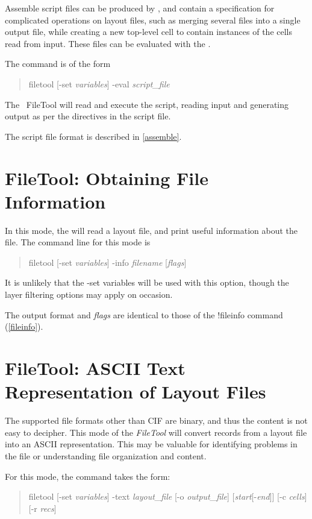 Assemble script files can be produced by {\Xic}, and contain a
specification for complicated operations on layout files, such as
merging several files into a single output file, while creating a new
top-level cell to contain instances of the cells read from input. 
These files can be evaluated with the {\FileTool}.

The command is of the form
\begin{quote}
{\vt filetool} [{\vt -set} {\it variables\/}] {\vt -eval}
  {\it script\_file}
\end{quote}

The {\ FileTool} will read and execute the script, reading input and
generating output as per the directives in the script file.

The script file format is described in \ref{assemble}.

\section{FileTool:  Obtaining File Information}

In this mode, the {\FileTool} will read a layout file, and print
useful information about the file.  The command line for this mode is
\begin{quote}
{\vt filetool} [{\vt -set} {\it variables\/}] {\vt -info}
  {\it filename} [{\it flags\/}]
\end{quote}

It is unlikely that the {\vt -set} variables will be used with this
option, though the layer filtering options may apply on occasion.

The output format and {\it flags} are identical to those of the
{\Xic} {\cb !fileinfo} command (\ref{fileinfo}).

\section{FileTool:  ASCII Text Representation of Layout Files}

The supported file formats other than CIF are binary, and thus the
content is not easy to decipher.  This mode of the {\it FileTool}
will convert records from a layout file into an ASCII representation. 
This may be valuable for identifying problems in the file or
understanding file organization and content.

For this mode, the command takes the form:
\begin{quote}
{\vt filetool} [{\vt -set} {\it variables\/}] {\vt -text}
    {\it layout\_file} [{\vt -o} {\it output\_file\/}]
    [{\it start\/}[-{\it end\/}]] [{\vt -c} {\it cells\/}]
    [{\vt -r} {\it recs\/}]
\end{quote}

